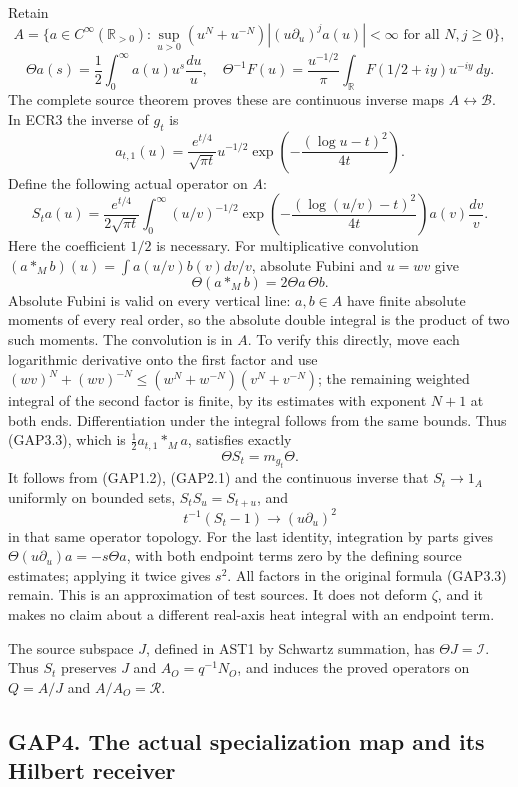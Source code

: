 Retain \[
A=\{a\in C^\infty(\mathbb R_{>0}):
\sup_{u>0}(u^N+u^{-N})|(u\partial_u)^ja(u)|<\infty
\text{ for all }N,j\ge0\},
\] \[
\Theta a(s)=\frac12\int_0^\infty a(u)u^s\frac{du}{u},\quad
\Theta^{-1}F(u)=\frac{u^{-1/2}}\pi
\int_{\mathbb R}F(1/2+iy)u^{-iy}\,dy.
\tag{GAP3.1}
\] The complete source theorem proves these are continuous inverse maps
\(A\leftrightarrow\mathcal B\). In ECR3 the inverse of \(g_t\) is \[
a_{t,1}(u)=\frac{e^{t/4}}{\sqrt{\pi t}}u^{-1/2}
\exp\!\left(-\frac{(\log u-t)^2}{4t}\right).
\tag{GAP3.2}
\] Define the following actual operator on \(A\): \[
\boxed{
S_ta(u)=\frac{e^{t/4}}{2\sqrt{\pi t}}
\int_0^\infty (u/v)^{-1/2}
\exp\!\left(-\frac{(\log(u/v)-t)^2}{4t}\right)
a(v)\frac{dv}{v}.}
\tag{GAP3.3}
\] Here the coefficient \(1/2\) is necessary. For multiplicative
convolution \((a*_Mb)(u)=\int a(u/v)b(v)dv/v\), absolute Fubini and
\(u=wv\) give \[
\Theta(a*_Mb)=2\Theta a\,\Theta b.
\tag{GAP3.4}
\] Absolute Fubini is valid on every vertical line: \(a,b\in A\) have
finite absolute moments of every real order, so the absolute double
integral is the product of two such moments. The convolution is in
\(A\). To verify this directly, move each logarithmic derivative onto
the first factor and use
\((wv)^N+(wv)^{-N}\le(w^N+w^{-N})(v^N+v^{-N})\); the remaining weighted
integral of the second factor is finite, by its estimates with exponent
\(N+1\) at both ends. Differentiation under the integral follows from
the same bounds. Thus (GAP3.3), which is \(\tfrac12a_{t,1}*_Ma\),
satisfies exactly \[
\Theta S_t=m_{g_t}\Theta.
\tag{GAP3.5}
\] It follows from (GAP1.2), (GAP2.1) and the continuous inverse that
\(S_t\to1_A\) uniformly on bounded sets, \(S_tS_u=S_{t+u}\), and \[
t^{-1}(S_t-1)\longrightarrow (u\partial_u)^2
\tag{GAP3.6}
\] in that same operator topology. For the last identity, integration by
parts gives \(\Theta(u\partial_u)a=-s\Theta a\), with both endpoint
terms zero by the defining source estimates; applying it twice gives
\(s^2\). All factors in the original formula (GAP3.3) remain. This is an
approximation of test sources. It does not deform \(\zeta\), and it
makes no claim about a different real-axis heat integral with an
endpoint term.

The source subspace \(J\), defined in AST1 by Schwartz summation, has
\(\Theta J=\mathcal I\). Thus \(S_t\) preserves \(J\) and
\(A_O=q^{-1}N_O\), and induces the proved operators on \(Q=A/J\) and
\(A/A_O=\mathcal R\).

\subsection{GAP4. The actual specialization map and its Hilbert
receiver}\label{gap4.-the-actual-specialization-map-and-its-hilbert-receiver}

